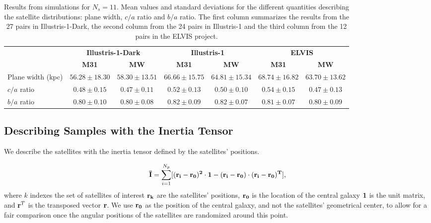 \documentclass[a4paper,fleqn,usenatbib]{mnras}
\begin{document}
\begin{table}
  \centering
  \renewcommand{\arraystretch}{1.2}
  \begin{tabular}{|p{2.5cm}|c|c|c|c|c|c|}
    \hline
    \multirow{2}{4.0cm}{} & \multicolumn{2}{c|}{\textbf{Illustris-1-Dark}} & \multicolumn{2}{c|}{\textbf{Illustris-1}} & \multicolumn{2}{c|}{\textbf{ELVIS}}\\
    \cline{2-7}
    & \textbf{M31} & \textbf{MW} & \textbf{M31} & \textbf{MW}& \textbf{M31} & \textbf{MW}\\
    \hline
Plane width (kpc) & $56.28\pm 18.30$ & $58.30 \pm 13.51$  & $66.66\pm 15.75$ & $64.81\pm 15.34$ & $68.74\pm 16.82$ & $63.70\pm 13.62$\\\hline
$c/a$ ratio & $0.48\pm 0.15$ & $0.47 \pm 0.11$  & $0.52\pm 0.13$ & $0.50\pm 0.10$ & $0.54\pm 0.15$ & $0.47\pm 0.13$\\\hline
$b/a$ ratio & $0.80\pm 0.10$ & $0.80 \pm 0.08$  & $0.82\pm 0.09$ & $0.82\pm 0.07$ & $0.81\pm 0.07$ & $0.80\pm 0.09$\\\hline
  \end{tabular}
  \caption{Results from simulations for $N_s=11$. Mean values and standard deviations for the different
    quantities describing the satellite distributions: plane width, $c/a$
    ratio and $b/a$ ratio. 
    The first column summarizes the results from the 27 pairs in
    Illustris-1-Dark, the second column from the 24 pairs in
    Illustris-1 and the third column from the 12 pairs in the
    ELVIS project.\label{table:simulations}}
\end{table}



\subsection{Describing Samples with the Inertia Tensor}

We describe the satellites with the inertia
tensor defined by the satellites' positions.  

\begin{equation}
{\bf{\bar{I}}} = \sum_{i=1}^{N_p}[(\bf{r}_i - \bf{r}_0)^2\cdot \bf{1} -
  (\bf{r}_i-\bf{r}_0)\cdot (\bf{r}_i - \bf{r}_0)^{T}],
\label{eq:intensor}
\end{equation}
%
where $k$ indexes the set of satellites of interest
$\bf{r}_k$ are the satellites' positions, $\bf{r}_{0}$ is the location
of the central galaxy $\bf{1}$ is the unit matrix, and  
${\bf r}^T$ is the transposed vector $\bf{r}$. 
We use $\bf{r}_0$ as the position of the central galaxy, and not the
satellites' geometrical center, to allow for a fair comparison once
the angular positions of the satellites are randomized around this
point. 
\end{document}
